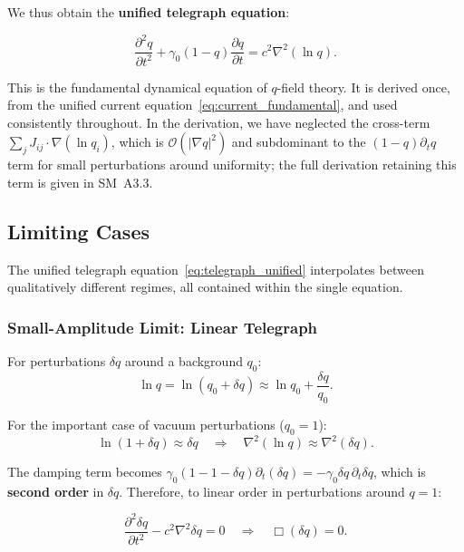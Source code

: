 \documentclass[aps,prd,twocolumn,showpacs,superscriptaddress,preprintnumbers]{revtex4-2}
\begin{document}
We thus obtain the \textbf{unified telegraph equation}:

\begin{equation}
\boxed{\frac{\partial^2 q}{\partial t^2} + \gamma_0(1-q)\frac{\partial q}{\partial t} = c^2\nabla^2(\ln q)}.
\label{eq:telegraph_unified}
\end{equation}

This is the fundamental dynamical equation of $q$-field theory.
It is derived once, from the unified current equation~\eqref{eq:current_fundamental}, and used consistently throughout.
In the derivation, we have neglected the cross-term $\sum_j J_{ij}\cdot\nabla(\ln q_i)$, which is $\mathcal{O}(|\nabla q|^2)$ and subdominant to the $(1-q)\partial_t q$ term for small perturbations around uniformity; the full derivation retaining this term is given in SM~A3.3.

\subsection{Limiting Cases}

The unified telegraph equation~\eqref{eq:telegraph_unified} interpolates between qualitatively different regimes, all contained within the single equation.

\subsubsection{Small-Amplitude Limit: Linear Telegraph}

For perturbations $\delta q$ around a background $q_0$:
\begin{equation}
\ln q = \ln(q_0 + \delta q) \approx \ln q_0 + \frac{\delta q}{q_0}.
\end{equation}

For the important case of vacuum perturbations ($q_0=1$):
\begin{equation}
\ln(1+\delta q) \approx \delta q \quad\Longrightarrow\quad \nabla^2(\ln q) \approx \nabla^2(\delta q).
\end{equation}

The damping term becomes $\gamma_0(1-1-\delta q)\partial_t(\delta q) = -\gamma_0\delta q\,\partial_t\delta q$, which is \textbf{second order} in $\delta q$.
Therefore, to linear order in perturbations around $q=1$:

\begin{equation}
\boxed{\frac{\partial^2 \delta q}{\partial t^2} - c^2\nabla^2\delta q = 0 \quad\Longrightarrow\quad \Box(\delta q) = 0}.
\label{eq:kg_vacuum}
\end{equation}
\end{document}
